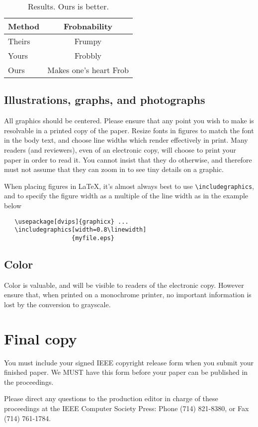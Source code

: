 \documentclass[10pt,twocolumn,letterpaper]{article}
\begin{document}
\begin{table}
\begin{center}
\begin{tabular}{|l|c|}
\hline
Method & Frobnability \\
\hline\hline
Theirs & Frumpy \\
Yours & Frobbly \\
Ours & Makes one's heart Frob\\
\hline
\end{tabular}
\end{center}
\caption{Results.   Ours is better.}
\end{table}

\subsection{Illustrations, graphs, and photographs}

All graphics should be centered.  Please ensure that any point you wish to
make is resolvable in a printed copy of the paper.  Resize fonts in figures
to match the font in the body text, and choose line widths which render
effectively in print.  Many readers (and reviewers), even of an electronic
copy, will choose to print your paper in order to read it.  You cannot
insist that they do otherwise, and therefore must not assume that they can
zoom in to see tiny details on a graphic.

When placing figures in \LaTeX, it's almost always best to use
\verb+\includegraphics+, and to specify the  figure width as a multiple of
the line width as in the example below
{\small\begin{verbatim}
   \usepackage[dvips]{graphicx} ...
   \includegraphics[width=0.8\linewidth]
                   {myfile.eps}
\end{verbatim}
}


\subsection{Color}

Color is valuable, and will be visible to readers of the electronic copy.
However ensure that, when printed on a monochrome printer, no important
information is lost by the conversion to grayscale.

\section{Final copy}

You must include your signed IEEE copyright release form when you submit
your finished paper. We MUST have this form before your paper can be
published in the proceedings.

Please direct any questions to the production editor in charge of these
proceedings at the IEEE Computer Society Press: Phone (714) 821-8380, or
Fax (714) 761-1784.

{\small


}
\end{document}
